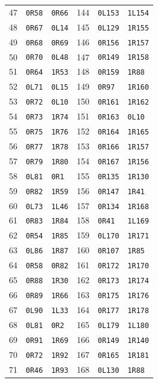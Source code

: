 \begin{longtable}{@{}rll@{\qquad}rll@{}}
47&\texttt{0R58}&\texttt{0R66}&144&\texttt{0L153}&\texttt{1L154}\\
48&\texttt{0R67}&\texttt{0L14}&145&\texttt{0L129}&\texttt{1R155}\\
49&\texttt{0R68}&\texttt{0R69}&146&\texttt{0R156}&\texttt{1R157}\\
50&\texttt{0R70}&\texttt{0L48}&147&\texttt{0R149}&\texttt{1R158}\\
51&\texttt{0R64}&\texttt{1R53}&148&\texttt{0R159}&\texttt{1R88}\\
52&\texttt{0L71}&\texttt{0L15}&149&\texttt{0R97}&\texttt{1R160}\\
53&\texttt{0R72}&\texttt{0L10}&150&\texttt{0R161}&\texttt{1R162}\\
54&\texttt{0R73}&\texttt{1R74}&151&\texttt{0R163}&\texttt{0L10}\\
55&\texttt{0R75}&\texttt{1R76}&152&\texttt{0R164}&\texttt{1R165}\\
56&\texttt{0R77}&\texttt{1R78}&153&\texttt{0R166}&\texttt{1R157}\\
57&\texttt{0R79}&\texttt{1R80}&154&\texttt{0R167}&\texttt{1R156}\\
58&\texttt{0L81}&\texttt{0R1}&155&\texttt{0R135}&\texttt{1R130}\\
59&\texttt{0R82}&\texttt{1R59}&156&\texttt{0R147}&\texttt{1R41}\\
60&\texttt{0L73}&\texttt{1L46}&157&\texttt{0R134}&\texttt{1R168}\\
61&\texttt{0R83}&\texttt{1R84}&158&\texttt{0R41}&\texttt{1L169}\\
62&\texttt{0R54}&\texttt{1R85}&159&\texttt{0L170}&\texttt{1R171}\\
63&\texttt{0L86}&\texttt{1R87}&160&\texttt{0R107}&\texttt{1R85}\\
64&\texttt{0R58}&\texttt{0R82}&161&\texttt{0R172}&\texttt{1R170}\\
65&\texttt{0R88}&\texttt{1R30}&162&\texttt{0R173}&\texttt{1R174}\\
66&\texttt{0R89}&\texttt{1R66}&163&\texttt{0R175}&\texttt{1R176}\\
67&\texttt{0L90}&\texttt{1L33}&164&\texttt{0R177}&\texttt{1R178}\\
68&\texttt{0L81}&\texttt{0R2}&165&\texttt{0L179}&\texttt{1L180}\\
69&\texttt{0R91}&\texttt{1R69}&166&\texttt{0R149}&\texttt{1R140}\\
70&\texttt{0R72}&\texttt{1R92}&167&\texttt{0R165}&\texttt{1R181}\\
71&\texttt{0R46}&\texttt{1R93}&168&\texttt{0L130}&\texttt{1R88}\\

\end{longtable}
